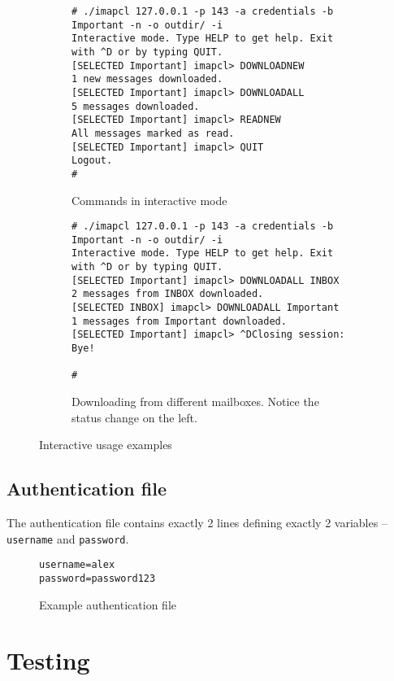 \documentclass[a4]{report}
\begin{document}
\begin{figure}[h!]
\begin{subfigure}{\textwidth}
\begin{mdframed}[backgroundcolor=lightgray]
\begin{verbatim}
# ./imapcl 127.0.0.1 -p 143 -a credentials -b Important -n -o outdir/ -i
Interactive mode. Type HELP to get help. Exit with ^D or by typing QUIT.
[SELECTED Important] imapcl> DOWNLOADNEW
1 new messages downloaded.
[SELECTED Important] imapcl> DOWNLOADALL
5 messages downloaded.
[SELECTED Important] imapcl> READNEW
All messages marked as read.
[SELECTED Important] imapcl> QUIT
Logout.
#
\end{verbatim}
\end{mdframed}
\caption{Commands in interactive mode}
\end{subfigure}
\begin{subfigure}{\textwidth}
\begin{mdframed}[backgroundcolor=lightgray]
\begin{verbatim}
# ./imapcl 127.0.0.1 -p 143 -a credentials -b Important -n -o outdir/ -i
Interactive mode. Type HELP to get help. Exit with ^D or by typing QUIT.
[SELECTED Important] imapcl> DOWNLOADALL INBOX
2 messages from INBOX downloaded.
[SELECTED INBOX] imapcl> DOWNLOADALL Important
1 messages from Important downloaded.
[SELECTED Important] imapcl> ^DClosing session: Bye!

#
\end{verbatim}
\end{mdframed}
\caption{Downloading from different mailboxes. Notice the status change on the left.}
\end{subfigure}
\caption{Interactive usage examples}
\end{figure}

\section{Authentication file}

The authentication file contains exactly 2 lines defining exactly 2 variables -- \texttt{username} and \texttt{password}.

\begin{figure}[h]
\begin{verbatim}
username=alex
password=password123
\end{verbatim}
\caption{Example authentication file}
\end{figure}

\chapter{Testing}
\end{document}
